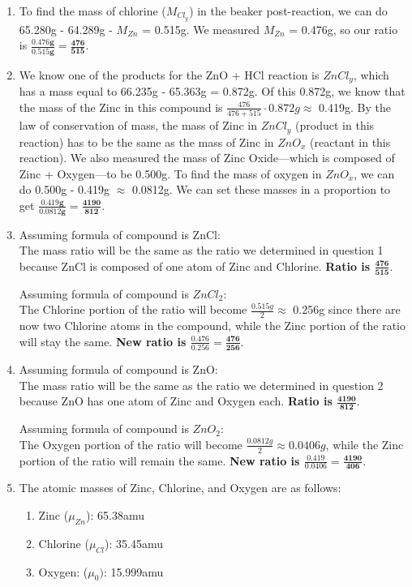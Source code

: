 \documentclass{article}
\begin{document}
\begin{enumerate}
\item To find the mass of chlorine ($M_{Cl_{y}}$) in the beaker post-reaction, we can do 65.280g - 64.289g - $M_{Zn}$ = 0.515g. We measured $M_{Zn}$ = 0.476g, so our ratio is $\mathbf{\frac{0.476g}{0.515g} = \frac{476}{515}}$.

\item  We know one of the products for the ZnO + HCl reaction is $ZnCl_{y}$, which has a mass equal to 66.235g - 65.363g = 0.872g. Of this 0.872g, we know that the mass of the Zinc in this compound is $\frac{476}{476 + 515} \cdot 0.872g \approx$ 0.419g. By the law of conservation of mass, the mass of Zinc in $ZnCl_{y}$ (product in this reaction) has to be the same as the mass of Zinc in $ZnO_{x}$ (reactant in this reaction). We also measured the mass of Zinc Oxide---which is composed of Zinc + Oxygen---to be 0.500g. To find the mass of oxygen in $ZnO_{x}$, we can do 0.500g - 0.419g $\approx$ 0.0812g. We can set these masses in a proportion to get $\mathbf{\frac{0.419g}{0.0812g} = \frac{4190}{812}}$. 

\item Assuming formula of compound is ZnCl: \\
The mass ratio will be the same as the ratio we determined in question 1 because ZnCl is composed of one atom of Zinc and Chlorine. \textbf{Ratio is $\mathbf{\frac{476}{515}}$}.

Assuming formula of compound is $ZnCl_{2}$: \\
The Chlorine portion of the ratio will become $\frac{0.515g}{2} \approx$ 0.256g since there are now two Chlorine atoms in the compound, while the Zinc portion of the ratio will stay the same. \textbf{New ratio is $\mathbf{\frac{0.476}{0.256} = \frac{476}{256}}$}.

\item Assuming formula of compound is ZnO: \\
The mass ratio will be the same as the ratio we determined in question 2 because ZnO has one atom of Zinc and Oxygen each. \textbf{Ratio is $\mathbf{\frac{4190}{812}}$}.

Assuming formula of compound is $ZnO_{2}$: \\
The Oxygen portion of the ratio will become $\frac{0.0812g}{2} \approx 0.0406g$, while the Zinc portion of the ratio will remain the same. \textbf{New ratio is $\mathbf{\frac{0.419}{0.0406} = \frac{4190}{406}}$}.

\item The atomic masses of Zinc, Chlorine, and Oxygen are as follows:
\begin{enumerate}
\item Zinc ($\mu_{Zn}$): 65.38amu
\item Chlorine ($\mu_{Cl}$): 35.45amu 
\item Oxygen: ($\mu_{0})$: 15.999amu
\end{enumerate}


\end{enumerate}
\end{document}
